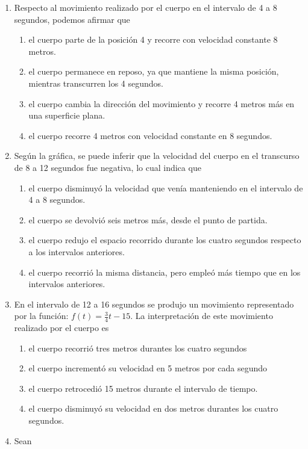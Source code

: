 \documentclass[10pt,twoside]{article}
\begin{document}
\begin{enumerate}
  \item Respecto al movimiento realizado por el cuerpo en el intervalo de 4 a 8 segundos, podemos afirmar que
  \begin{enumerate}
    \item el cuerpo parte de la posición 4 y recorre con velocidad constante 8 metros.
    \item el cuerpo permanece en reposo, ya que mantiene la misma posición, mientras transcurren los 4 segundos.
    \item el cuerpo cambia la dirección del movimiento y recorre 4 metros más en una superficie plana.
    \item el cuerpo recorre 4 metros con velocidad constante en 8 segundos.
  \end{enumerate}
  \item Según la gráfica, se puede inferir que la velocidad del cuerpo en el transcurso de 8 a 12 segundos fue negativa, lo cual indica que
  \begin{enumerate}
    \item el cuerpo disminuyó la velocidad que venía manteniendo en el intervalo de 4 a 8 segundos.
    \item el cuerpo se devolvió seis metros más, desde el punto de partida.
    \item el cuerpo redujo el espacio recorrido durante los cuatro segundos respecto a los intervalos anteriores.
    \item el cuerpo recorrió la misma distancia, pero empleó más tiempo que en los intervalos anteriores.
  \end{enumerate}
  \item En el intervalo de 12 a 16 segundos se produjo un movimiento representado por la función: $ f(t)=\frac{3}{4}t-15 $. La interpretación de este movimiento realizado por el cuerpo es
  \begin{enumerate}
    \item el cuerpo recorrió tres metros durantes los cuatro segundos
    \item el cuerpo incrementó su velocidad en 5 metros por cada segundo
    \item el cuerpo retrocedió 15 metros durante el intervalo de tiempo.
    \item el cuerpo disminuyó su velocidad en dos metros durantes los cuatro segundos.
  \end{enumerate}
    \item Sean\\

\end{enumerate}
\end{document}
